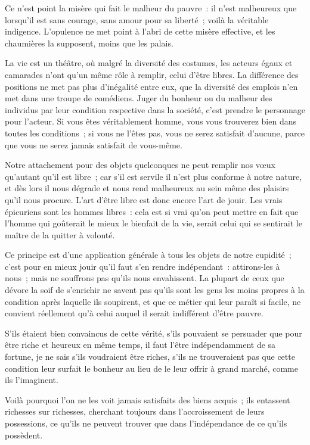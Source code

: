 \documentclass[french,twoside]{book} %
\begin{document}
Ce n’est point la misère qui fait le malheur du pauvre : il n’est malheureux que lorsqu’il est sans courage, sans amour pour sa liberté ; voilà la véritable indigence. L’opulence ne met point à l’abri de cette misère effective, et les chaumières la supposent, moins que les palais.\par
La vie est un théâtre, où malgré la diversité des costumes, les acteurs égaux et camarades n’ont qu’un même rôle à remplir, celui d’être libres. La différence des positions ne met pas plus d’inégalité entre eux, que la diversité des emplois n’en met dans une troupe de comédiens. Juger du bonheur ou du malheur des individus par leur condition respective dans la société, c’est prendre le personnage pour l’acteur. Si vous êtes véritablement homme, vous vous trouverez bien dans toutes les conditions ; si vous ne l’êtes pas, vous ne serez satisfait d’aucune, parce que vous ne serez jamais satisfait de vous-même.\par
Notre attachement pour des objets quelconques ne peut remplir nos vœux qu’autant qu’il est libre ; car s’il est servile il n’est plus conforme à notre nature, et dès lors il nous dégrade et nous rend malheureux au sein même des plaisirs qu’il nous procure. L’art d’être libre est donc encore l’art de jouir. Les vrais épicuriens sont les hommes libres : cela est si vrai qu’on peut mettre en fait que l’homme qui goûterait le mieux le bienfait de la vie, serait celui qui se sentirait le maître de la quitter à volonté.\par
Ce principe est d’une application générale à tous les objets de notre cupidité ; c’est pour en mieux jouir qu’il faut s’en rendre indépendant : attirons-les à nous ; mais ne souffrons pas qu’ils nous envahissent. La plupart de ceux que dévore la soif de s’enrichir ne savent pas qu’ils sont les gens les moins propres à la condition après laquelle ils soupirent, et que ce métier qui leur paraît si facile, ne convient réellement qu’à celui auquel il serait indifférent d’être pauvre.\par
S’ils étaient bien convaincus de cette vérité, s’ils pouvaient se persuader que pour être riche et heureux en même temps, il faut l’être indépendamment de sa fortune, je ne sais s’ils voudraient être riches, s’ils ne trouveraient pas que cette condition leur surfait le bonheur au lieu de le leur offrir à grand marché, comme ils l’imaginent.\par
Voilà pourquoi l’on ne les voit jamais satisfaits des biens acquis ; ils entassent richesses sur richesses, cherchant toujours dans l’accroissement de leurs possessions, ce qu’ils ne peuvent trouver que dans l’indépendance de ce qu’ils possèdent.\par
\end{document}
